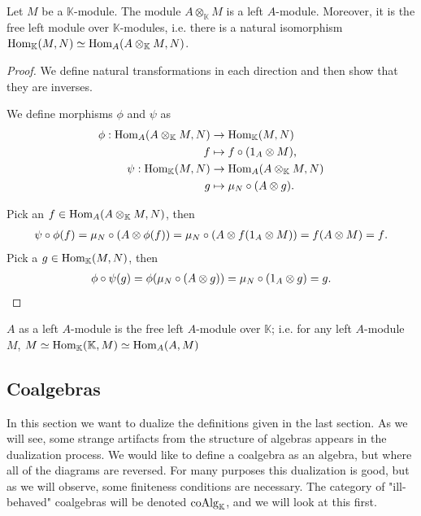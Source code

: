 \documentclass[../thesis.tex]{subfiles}
\begin{document}
            \begin{proposition}\label{prop: free-mod}
                Let $M$ be a $\mathbb{K}$-module. The module $A\otimes_{\mathbb{K}}M$ is a left $A$-module. Moreover, it is the free left module over $\mathbb{K}$-modules, i.e. there is a natural isomorphism $\tt{Hom}_{\mathbb{K}}(M,N)\simeq \tt{Hom}_{A}(A\otimes_{\mathbb{K}}M,N)$.
            \end{proposition}

            \begin{proof}
                We define natural transformations in each direction and then show that they are inverses.

                We define morphisms $\phi$ and $\psi$ as
                \begin{align*}
                    \phi : \tt{Hom}_A(A\otimes_\mathbb{K}M, N) & \rightarrow \tt{Hom}_\mathbb{K}(M,N) \\
                    f & \mapsto f \circ (1_A \otimes M)\tt{,} \\
                    \psi : \tt{Hom}_\mathbb{K}(M, N) & \rightarrow \tt{Hom}_A(A\otimes_\mathbb{K}M, N) \\
                    g & \mapsto \mu_N \circ (A \otimes g)\tt{.}
                \end{align*}

                Pick an $f \in \tt{Hom}_A(A\otimes_\mathbb{K}M, N)$, then
                \begin{align*}
                        \psi\circ\phi (f) = \mu_N \circ (A \otimes \phi (f)) = \mu_N \circ (A \otimes f (1_A \otimes M)) = f (A \otimes M) = f\tt{.}
                \end{align*}
                Pick a $g \in \tt{Hom}_\mathbb{K}(M,N)$, then
                \begin{align*}
                    \phi\circ\psi (g) = \phi (\mu_N \circ (A \otimes g)) = \mu_N \circ (1_A \otimes g) = g\tt{.}
                \end{align*}
            \end{proof}

            \begin{corollary}
                $A$ as a left $A$-module is the free left $A$-module over $\mathbb{K}$; i.e. for any left $A$-module $M$, $M \simeq \tt{Hom}_\mathbb{K}(\mathbb{K}, M) \simeq \tt{Hom}_A(A,M)$
            \end{corollary}
            
    \subsection{Coalgebras}
            In this section we want to dualize the definitions given in the last section. As we will see, some strange artifacts from the structure of algebras appears in the dualization process. We would like to define a coalgebra as an algebra, but where all of the diagrams are reversed. For many purposes this dualization is good, but as we will observe, some finiteness conditions are necessary. The category of "ill-behaved" coalgebras will be denoted $\tt{coAlg}_\mathbb{K}$, and we will look at this first.
\end{document}
